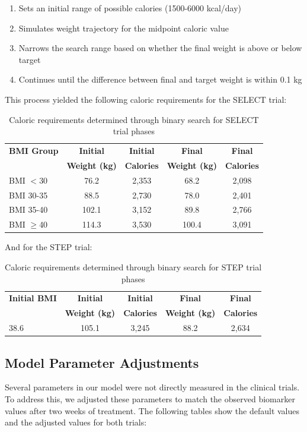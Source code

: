 \begin{enumerate}
    \item Sets an initial range of possible calories (1500-6000 kcal/day)
    \item Simulates weight trajectory for the midpoint caloric value
    \item Narrows the search range based on whether the final weight is above or below target
    \item Continues until the difference between final and target weight is within 0.1 kg
\end{enumerate}

This process yielded the following caloric requirements for the SELECT trial:

\begin{table}[h]
\centering
\begin{tabular}{|l|c|c|c|c|}
\hline
\textbf{BMI Group} & \textbf{Initial} & \textbf{Initial} & \textbf{Final} & \textbf{Final} \\
& \textbf{Weight (kg)} & \textbf{Calories} & \textbf{Weight (kg)} & \textbf{Calories} \\
\hline
BMI $<$30 & 76.2 & 2,353 & 68.2 & 2,098 \\
BMI 30-35 & 88.5 & 2,730 & 78.0 & 2,401 \\
BMI 35-40 & 102.1 & 3,152 & 89.8 & 2,766 \\
BMI $\geq$40 & 114.3 & 3,530 & 100.4 & 3,091 \\
\hline
\end{tabular}
\caption{Caloric requirements determined through binary search for SELECT trial phases}
\end{table}

And for the STEP trial:

\begin{table}[h]
\centering
\begin{tabular}{|l|c|c|c|c|}
\hline
\textbf{Initial BMI} & \textbf{Initial} & \textbf{Initial} & \textbf{Final} & \textbf{Final} \\
& \textbf{Weight (kg)} & \textbf{Calories} & \textbf{Weight (kg)} & \textbf{Calories} \\
\hline
38.6 & 105.1 & 3,245 & 88.2 & 2,634 \\
\hline
\end{tabular}
\caption{Caloric requirements determined through binary search for STEP trial phases}
\end{table}

\subsection{Model Parameter Adjustments}
Several parameters in our model were not directly measured in the clinical trials. To address this, we adjusted these parameters to match the observed biomarker values after two weeks of treatment. The following tables show the default values and the adjusted values for both trials:

